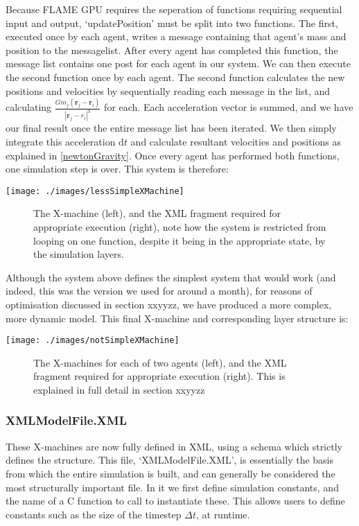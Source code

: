 \documentclass[11pt,a4paper]{article}
\begin{document}
\noindent Because FLAME GPU requires the seperation of functions requiring sequential input and output, `updatePosition' must be split into two functions. The first, executed once by each agent, writes a message containing that agent's mass and position to the messagelist. After every agent has completed this function, the message list contains one post for each agent in our system. We can then execute the second function once by each agent. The second function calculates the new positions and velocities by sequentially reading each message in the list, and calculating $\frac{Gm_j(\mathbf r_j - \mathbf r_i)}{|\mathbf r_j - r_i|^3}$ for each. Each acceleration vector is summed, and we have our final result once the entire message list has been iterated. We then simply integrate this acceleration $\mathrm{d}t$ and calculate resultant velocities and positions as explained in \ref{newtonGravity}. Once every agent has performed both functions, one simulation step is over. This system is therefore:

\texttt{[image: ./images/lessSimpleXMachine]}
\begin{figure}[h!]
\caption[N-body X-machine with serparate I/O]{The X-machine (left), and the XML fragment required for appropriate execution (right), note how the system is restricted from looping on one function, despite it being in the appropriate state, by the simulation layers.}
\label{lessSimpleXMachine}
\end{figure}

\noindent Although the system above defines the simplest system that would work (and indeed, this was the version we used for around a month), for reasons of optimisation discussed in section xxyyzz, we have produced a more complex, more dynamic model. This final X-machine and corresponding layer structure is:

\texttt{[image: ./images/notSimpleXMachine]}
\begin{figure}[h!]
\caption[Final, implemented X-machine]{The X-machines for each of two agents (left), and the XML fragment required for appropriate execution (right). This is explained in full detail in section xxyyzz}
\end{figure}

\subsubsection{XMLModelFile.XML}
\label{xmlModelFileDesign}
These X-machines are now fully defined in XML, using a schema which strictly defines the structure. This file, `XMLModelFile.XML', is essentially the basis from which the entire simulation is built, and can generally be considered the most structurally important file. In it we first define simulation constants, and the name of a C function to call to instantiate these. This allows users to define constants such as the size of the timestep $\Delta t$, at runtime.
\end{document}
